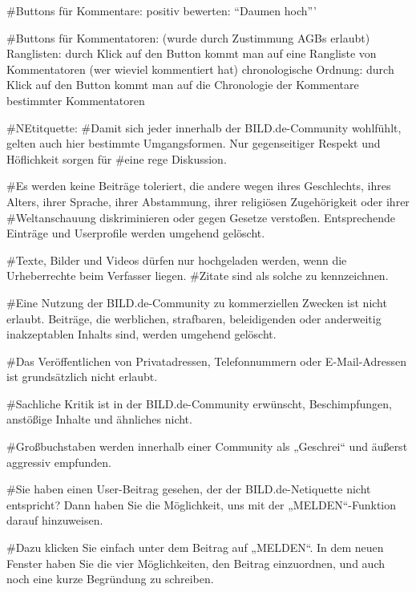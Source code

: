 #Buttons für Kommentare: 
	positiv bewerten: ``Daumen hoch'''
	
	

#Buttons für Kommentatoren:  (wurde durch Zustimmung AGBs erlaubt)
	Ranglisten: durch Klick auf den Button kommt man auf eine Rangliste von Kommentatoren (wer wieviel kommentiert hat)
	chronologische Ordnung: durch Klick auf den Button kommt man auf die Chronologie der Kommentare bestimmter Kommentatoren

#NEtitquette:
#Damit sich jeder innerhalb der BILD.de-Community wohlfühlt, gelten auch hier bestimmte Umgangsformen. Nur gegenseitiger Respekt und Höflichkeit sorgen für #eine rege Diskussion.

#Es werden keine Beiträge toleriert, die andere wegen ihres Geschlechts, ihres Alters, ihrer Sprache, ihrer Abstammung, ihrer religiösen Zugehörigkeit oder ihrer #Weltanschauung diskriminieren oder gegen Gesetze verstoßen. Entsprechende Einträge und Userprofile werden umgehend gelöscht.

#Texte, Bilder und Videos dürfen nur hochgeladen werden, wenn die Urheberrechte beim Verfasser liegen. #Zitate sind als solche zu kennzeichnen.

#Eine Nutzung der BILD.de-Community zu kommerziellen Zwecken ist nicht erlaubt. Beiträge, die werblichen, strafbaren, beleidigenden oder anderweitig inakzeptablen Inhalts sind, werden umgehend gelöscht.

#Das Veröffentlichen von Privatadressen, Telefonnummern oder E-Mail-Adressen ist grundsätzlich nicht erlaubt.

#Sachliche Kritik ist in der BILD.de-Community erwünscht, Beschimpfungen, anstößige Inhalte und ähnliches nicht.

#Großbuchstaben werden innerhalb einer Community als „Geschrei“ und äußerst aggressiv empfunden.

#Sie haben einen User-Beitrag gesehen, der der BILD.de-Netiquette nicht entspricht? Dann haben Sie die Möglichkeit, uns mit der „MELDEN“-Funktion darauf hinzuweisen.

#Dazu klicken Sie einfach unter dem Beitrag auf „MELDEN“. In dem neuen Fenster haben Sie die vier Möglichkeiten, den Beitrag einzuordnen, und auch noch eine kurze Begründung zu schreiben.
